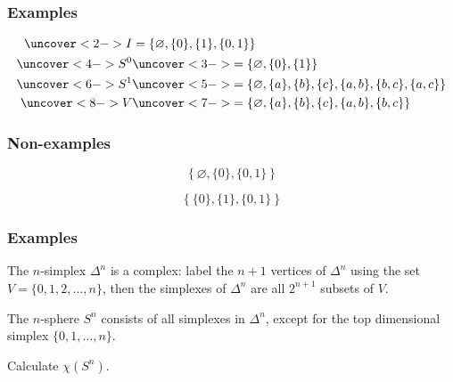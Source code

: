 \documentclass[14pt]{beamer}
\begin{document}
\begin{frame}
\frametitle{Examples}

\begin{align*}
\vspace{1ex}\uncover<2->{I} &= \left\{ \varnothing, \{0\}, \{1\}, \{0,1\} \right\} \\
\vspace{1ex}\uncover<4->{S^0} &\uncover<3->{= \left\{ \varnothing, \{0\}, \{1\} \right\}} \\
\vspace{1ex}\uncover<6->{S^1} &\uncover<5->{= \left\{ \varnothing, \{a\}, \{b\}, \{c\}, \{a,b\},\{b,c\},\{a,c\} \right\}} \\
\vspace{1ex}\uncover<8->{V} &\uncover<7->{= \left\{ \varnothing, \{a\}, \{b\}, \{c\}, \{a,b\},\{b,c\} \right\}}
\end{align*}
\end{frame}

\begin{frame}
\frametitle{Non-examples}

\pause
$$ \left\{ \varnothing, \{0\}, \{0,1\} \right\} $$

\pause
$$ \left\{ \{0\}, \{1\}, \{0,1\} \right\} $$

\end{frame}

\begin{frame}
\frametitle{Examples}

The $n$-simplex $\Delta^n$ is a complex: label the $n+1$ vertices of $\Delta^n$ using the set $V = \{ 0, 1, 2, \ldots, n \}$, then the simplexes of $\Delta^n$ are all $2^{n+1}$ subsets of $V$.

\vfill

The $n$-sphere $S^n$ consists of all simplexes in $\Delta^n$, except for the top dimensional simplex $\{0,1,\ldots,n\}$.

\vfill
\pause

\begin{problem}
Calculate $\chi(S^n)$.
\end{problem}

\vfill

\end{frame}
\end{document}
